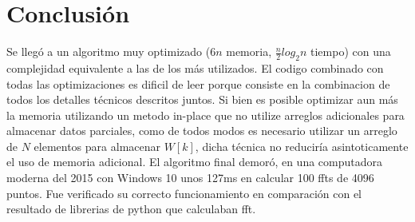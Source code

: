 \documentclass[assd_tp2_main.tex]{subfiles}
\begin{document}
\section{Conclusión}
Se llegó a un algoritmo muy optimizado ($6n$ memoria, $\frac{n}{2}log_2{n}$ tiempo) con una complejidad equivalente a las de los más utilizados.
El codigo combinado con todas las optimizaciones es dificil de leer porque consiste en la combinacion de todos los detalles técnicos descritos juntos.
Si bien es posible optimizar aun más la memoria utilizando un metodo in-place que no utilize arreglos adicionales para almacenar datos parciales, como de todos modos es necesario utilizar un arreglo de $N$ elementos para almacenar $W[k]$, dicha técnica no reduciría asintoticamente el uso de memoria adicional.
El algoritmo final demoró, en una computadora moderna del 2015 con Windows 10 unos 127ms en calcular 100 ffts de 4096 puntos.
Fue verificado su correcto funcionamiento en comparación con el resultado de librerias de python que calculaban fft.
\end{document}
